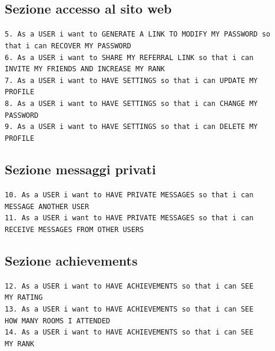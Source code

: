 	\subsection{Sezione accesso al sito web}
	\texttt{5. As a USER i want to GENERATE A LINK TO MODIFY MY PASSWORD so \\ that i can RECOVER MY PASSWORD}\\
	\texttt{6. As a USER i want to SHARE MY REFERRAL LINK so that i can \\ INVITE MY FRIENDS AND INCREASE MY RANK}\\
	\texttt{7. As a USER i want to HAVE SETTINGS so that i can UPDATE MY \\ PROFILE}\\
	\texttt{8. As a USER i want to HAVE SETTINGS so that i can CHANGE MY \\ PASSWORD}\\
	\texttt{9. As a USER i want to HAVE SETTINGS so that i can DELETE MY \\ PROFILE}
	
	\subsection{Sezione messaggi privati}
	\texttt{10. As a USER i want to HAVE PRIVATE MESSAGES so that i can \\ MESSAGE ANOTHER USER}\\
	\texttt{11. As a USER i want to HAVE PRIVATE MESSAGES so that i can \\ RECEIVE MESSAGES FROM OTHER USERS}
	
	\subsection{Sezione achievements}
	
	\texttt{12. As a USER i want to HAVE ACHIEVEMENTS so that i can SEE \\ MY RATING}\\
	\texttt{13. As a USER i want to HAVE ACHIEVEMENTS so that i can SEE \\ HOW MANY ROOMS I ATTENDED}\\
	\texttt{14. As a USER i want to HAVE ACHIEVEMENTS so that i can SEE\\  MY RANK}
	
